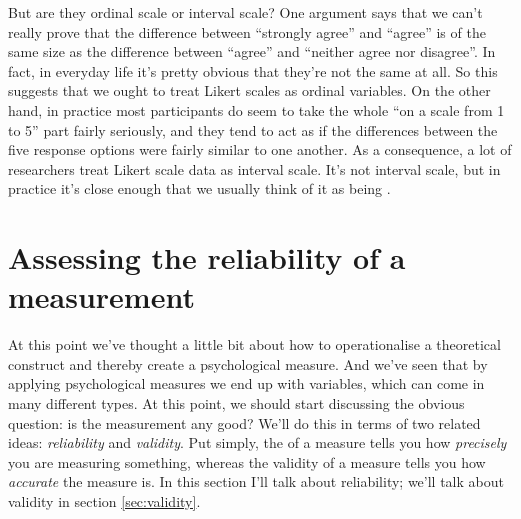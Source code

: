 But are they ordinal scale or interval scale? One argument says that we can't really prove that the difference between ``strongly agree'' and ``agree'' is of the same size as the difference between ``agree'' and ``neither agree nor disagree''. In fact, in everyday life it's pretty obvious that they're not the same at all. So this suggests that we ought to treat Likert scales as ordinal variables. On the other hand, in practice most participants do seem to take the whole ``on a scale from 1 to 5'' part fairly seriously, and they tend to act as if the differences between the five response options were fairly similar to one another. As a consequence, a lot of researchers treat Likert scale data as interval scale. It's not interval scale, but in practice it's close enough that we usually think of it as being .  

\section{Assessing the reliability of a measurement~\label{sec:reliability}}

At this point we've thought a little bit about how to operationalise a theoretical construct and thereby create a psychological measure. And we've seen that by applying psychological measures we end up with variables, which can come in many different types. At this point, we should start discussing the obvious question: is the measurement any good? We'll do this in terms of two related ideas: {\it reliability} and {\it validity}. Put simply, the  of a measure tells you how {\it precisely} you are measuring something, whereas the validity of a measure tells you how {\it accurate} the measure is. In this section I'll talk about reliability; we'll talk about validity in section \ref{sec:validity}. 

